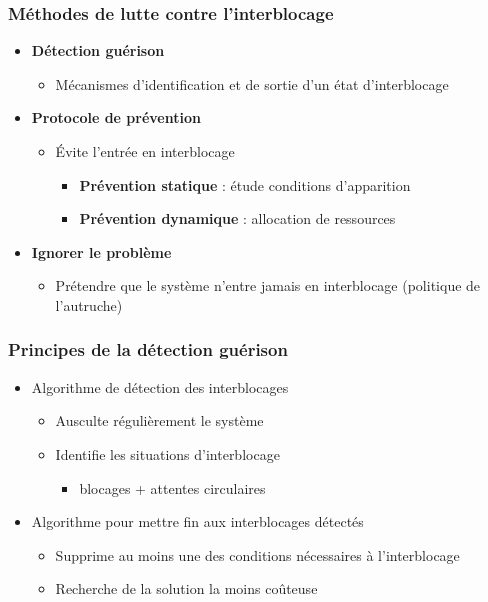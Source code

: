 \begin{frame}
\frametitle{Méthodes de lutte contre l’interblocage}
\begin{itemize}
\item \textbf{Détection guérison}
\begin{itemize}
\item Mécanismes d’identification et de sortie d’un état d’interblocage
\end{itemize}
\item \textbf{Protocole de prévention}
\begin{itemize}
\item Évite l’entrée en interblocage
\begin{itemize}
\item \textbf{Prévention statique} : étude conditions d’apparition
\item \textbf{Prévention dynamique} : allocation de ressources
\end{itemize}
\end{itemize}
\item \textbf{Ignorer le problème}
\begin{itemize}
\item Prétendre que le système n’entre jamais en interblocage (politique de l’autruche)
\end{itemize}
\end{itemize}
\end{frame}

\begin{frame}
\frametitle{Principes de la \textbf{détection guérison}}
\begin{itemize}
\item <1-> [détection] Algorithme de détection des interblocages
\begin{itemize}
\item Ausculte régulièrement le système
\item Identifie les situations d’interblocage
\begin{itemize}
\item blocages + attentes circulaires
\end{itemize}
\end{itemize}
\item <2-> [guérison] Algorithme pour mettre fin aux interblocages détectés
\begin{itemize}
\item Supprime au moins une des conditions nécessaires à l’interblocage
\item Recherche de la solution la moins coûteuse
\end{itemize}
\end{itemize}
\end{frame}

